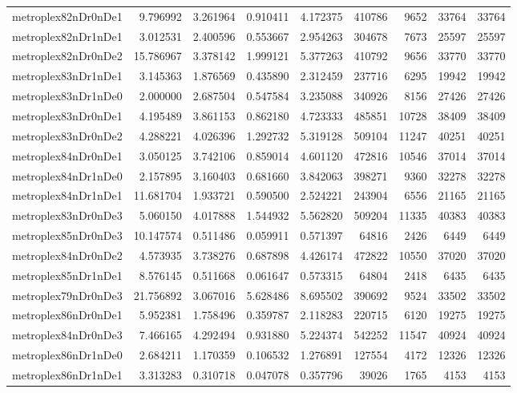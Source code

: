 \documentclass[../../../thesis.tex]{subfiles}
\begin{document}
\begin{longtable}{|l|r|r|r|r|r|r|r|r|}
metroplex82nDr0nDe1 & 9.796992 & 3.261964 & 0.910411 & 4.172375 & 410786 & 9652 & 33764 & 33764 \\
metroplex82nDr1nDe1 & 3.012531 & 2.400596 & 0.553667 & 2.954263 & 304678 & 7673 & 25597 & 25597 \\
metroplex82nDr0nDe2 & 15.786967 & 3.378142 & 1.999121 & 5.377263 & 410792 & 9656 & 33770 & 33770 \\
metroplex83nDr1nDe1 & 3.145363 & 1.876569 & 0.435890 & 2.312459 & 237716 & 6295 & 19942 & 19942 \\
metroplex83nDr1nDe0 & 2.000000 & 2.687504 & 0.547584 & 3.235088 & 340926 & 8156 & 27426 & 27426 \\
metroplex83nDr0nDe1 & 4.195489 & 3.861153 & 0.862180 & 4.723333 & 485851 & 10728 & 38409 & 38409 \\
metroplex83nDr0nDe2 & 4.288221 & 4.026396 & 1.292732 & 5.319128 & 509104 & 11247 & 40251 & 40251 \\
metroplex84nDr0nDe1 & 3.050125 & 3.742106 & 0.859014 & 4.601120 & 472816 & 10546 & 37014 & 37014 \\
metroplex84nDr1nDe0 & 2.157895 & 3.160403 & 0.681660 & 3.842063 & 398271 & 9360 & 32278 & 32278 \\
metroplex84nDr1nDe1 & 11.681704 & 1.933721 & 0.590500 & 2.524221 & 243904 & 6556 & 21165 & 21165 \\
metroplex83nDr0nDe3 & 5.060150 & 4.017888 & 1.544932 & 5.562820 & 509204 & 11335 & 40383 & 40383 \\
metroplex85nDr0nDe3 & 10.147574 & 0.511486 & 0.059911 & 0.571397 & 64816 & 2426 & 6449 & 6449 \\
metroplex84nDr0nDe2 & 4.573935 & 3.738276 & 0.687898 & 4.426174 & 472822 & 10550 & 37020 & 37020 \\
metroplex85nDr1nDe1 & 8.576145 & 0.511668 & 0.061647 & 0.573315 & 64804 & 2418 & 6435 & 6435 \\
metroplex79nDr0nDe3 & 21.756892 & 3.067016 & 5.628486 & 8.695502 & 390692 & 9524 & 33502 & 33502 \\
metroplex86nDr0nDe1 & 5.952381 & 1.758496 & 0.359787 & 2.118283 & 220715 & 6120 & 19275 & 19275 \\
metroplex84nDr0nDe3 & 7.466165 & 4.292494 & 0.931880 & 5.224374 & 542252 & 11547 & 40924 & 40924 \\
metroplex86nDr1nDe0 & 2.684211 & 1.170359 & 0.106532 & 1.276891 & 127554 & 4172 & 12326 & 12326 \\
metroplex86nDr1nDe1 & 3.313283 & 0.310718 & 0.047078 & 0.357796 & 39026 & 1765 & 4153 & 4153 \\

\end{longtable}
\end{document}
